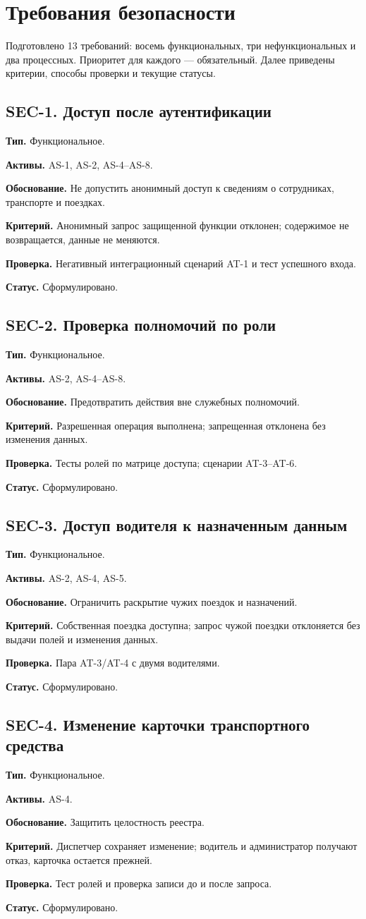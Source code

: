 \documentclass[12pt,a4paper]{article}
\newcommand{\field}[2]{\noindent\textbf{#1.} #2\par}
\begin{document}
\section{Требования безопасности}
Подготовлено 13 требований: восемь функциональных, три нефункциональных и два процессных. Приоритет для каждого — обязательный. Далее приведены критерии, способы проверки и текущие статусы.

\subsection*{SEC-1. Доступ после аутентификации}
\field{Тип}{Функциональное.}
\field{Активы}{AS-1, AS-2, AS-4--AS-8.}
\field{Обоснование}{Не допустить анонимный доступ к сведениям о сотрудниках, транспорте и поездках.}
\field{Критерий}{Анонимный запрос защищенной функции отклонен; содержимое не возвращается, данные не меняются.}
\field{Проверка}{Негативный интеграционный сценарий AT-1 и тест успешного входа.}
\field{Статус}{Сформулировано.}

\subsection*{SEC-2. Проверка полномочий по роли}
\field{Тип}{Функциональное.}
\field{Активы}{AS-2, AS-4--AS-8.}
\field{Обоснование}{Предотвратить действия вне служебных полномочий.}
\field{Критерий}{Разрешенная операция выполнена; запрещенная отклонена без изменения данных.}
\field{Проверка}{Тесты ролей по матрице доступа; сценарии AT-3--AT-6.}
\field{Статус}{Сформулировано.}

\subsection*{SEC-3. Доступ водителя к назначенным данным}
\field{Тип}{Функциональное.}
\field{Активы}{AS-2, AS-4, AS-5.}
\field{Обоснование}{Ограничить раскрытие чужих поездок и назначений.}
\field{Критерий}{Собственная поездка доступна; запрос чужой поездки отклоняется без выдачи полей и изменения данных.}
\field{Проверка}{Пара AT-3/AT-4 с двумя водителями.}
\field{Статус}{Сформулировано.}

\subsection*{SEC-4. Изменение карточки транспортного средства}
\field{Тип}{Функциональное.}
\field{Активы}{AS-4.}
\field{Обоснование}{Защитить целостность реестра.}
\field{Критерий}{Диспетчер сохраняет изменение; водитель и администратор получают отказ, карточка остается прежней.}
\field{Проверка}{Тест ролей и проверка записи до и после запроса.}
\field{Статус}{Сформулировано.}
\end{document}
